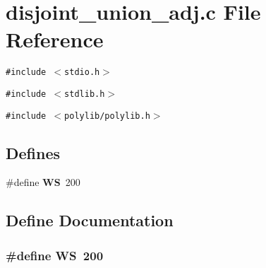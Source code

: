 \section{disjoint\_\-union\_\-adj.c File Reference}
\label{disjoint__union__adj_8c}
{\tt \#include $<$stdio.h$>$}\par
{\tt \#include $<$stdlib.h$>$}\par
{\tt \#include $<$polylib/polylib.h$>$}\par
\subsection*{Defines}
\begin{CompactItemize}
\item 
\#define {\bf WS}\ 200
\end{CompactItemize}


\subsection{Define Documentation}
\subsubsection{\setlength{\rightskip}{0pt plus 5cm}\#define WS\ 200}\label{disjoint__union__adj_8c_a0}


